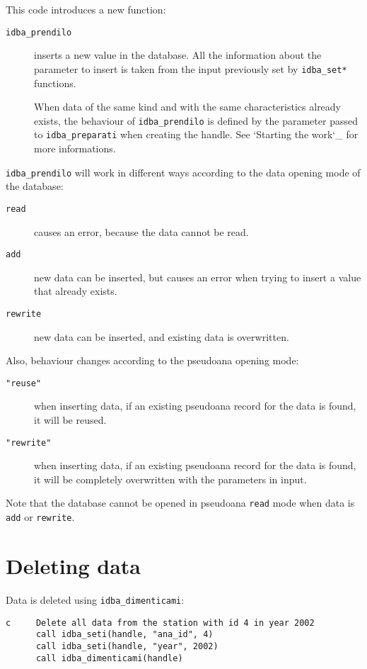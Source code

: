 \documentclass[final,12pt,a4paper,twoside]{book}
\begin{document}
This code introduces a new function:

\begin{description}
\item[{\tt idba\_prendilo}]
  inserts a new value in the database.  All the information about the parameter
  to insert is taken from the input previously set by {\tt idba\_set*} functions.

  When data of the same kind and with the same characteristics already exists,
  the behaviour of {\tt idba\_prendilo} is defined by the parameter passed to
  {\tt idba\_preparati} when creating the handle.  See `Starting the work`\_ for
  more informations.
\end{description}

{\tt idba\_prendilo} will work in different ways according to the data opening
mode of the database:

\begin{description}
\item[{\tt read}]
  causes an error, because the data cannot be read.
\item[{\tt add}]
  new data can be inserted, but causes an error when trying to insert a value
  that already exists.
\item[{\tt rewrite}]
  new data can be inserted, and existing data is overwritten.
\end{description}

Also, behaviour changes according to the pseudoana opening mode:

\begin{description}
\item[{\tt "reuse"}] when inserting data, if an existing pseudoana record for
	       the data is found, it will be reused.
\item[{\tt "rewrite"}] when inserting data, if an existing pseudoana record for
	     the data is found, it will be completely overwritten with
	     the parameters in input.
\end{description}

Note that the database cannot be opened in pseudoana {\tt read} mode when data
is {\tt add} or {\tt rewrite}.
  
\section{Deleting data}

Data is deleted using {\tt idba\_dimenticami}:
\label{fun-idba_dimenticami}

\begin{verbatim}
c     Delete all data from the station with id 4 in year 2002
      call idba_seti(handle, "ana_id", 4)
      call idba_seti(handle, "year", 2002)
      call idba_dimenticami(handle)
\end{verbatim}
\end{document}
